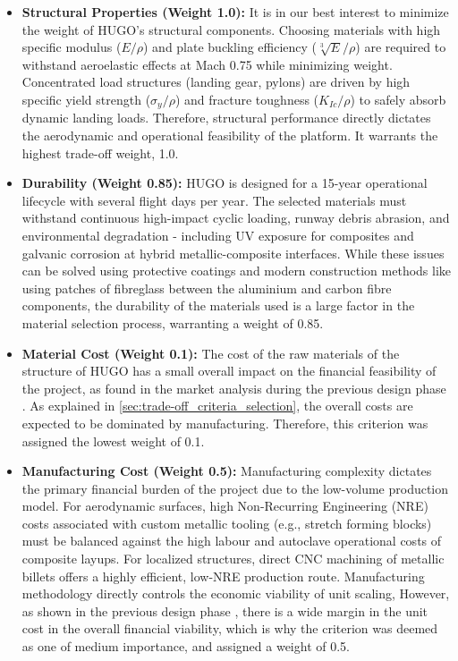 \begin{itemize}
    \item \textbf{Structural Properties (Weight 1.0):} It is in our best interest to minimize the weight of HUGO's structural components. Choosing materials with high specific modulus ($E/\rho$) and plate buckling efficiency ($\sqrt[3]{E}/\rho$) are required to withstand aeroelastic effects at Mach 0.75 while minimizing weight. Concentrated load structures (landing gear, pylons) are driven by high specific yield strength ($\sigma_y/\rho$) and fracture toughness ($K_{Ic}/\rho$) to safely absorb dynamic landing loads. Therefore, structural performance directly dictates the aerodynamic and operational feasibility of the platform. It warrants the highest trade-off weight, 1.0.
    
    \item \textbf{Durability (Weight 0.85):} HUGO is designed for a 15-year operational lifecycle with several flight days per year. The selected materials must withstand continuous high-impact cyclic loading, runway debris abrasion, and environmental degradation - including UV exposure for composites and galvanic corrosion at hybrid metallic-composite interfaces. While these issues can be solved using protective coatings and modern construction methods like using patches of fibreglass between the aluminium and carbon fibre components, the durability of the materials used is a large factor in the material selection process, warranting a weight of 0.85. 

    \item \textbf{Material Cost (Weight 0.1):} The cost of the raw materials of the structure of HUGO has a small overall impact on the financial feasibility of the project, as found in the market analysis during the previous design phase . As explained in \autoref{sec:trade-off_criteria_selection}, the overall costs are expected to be dominated by manufacturing. Therefore, this criterion was assigned the lowest weight of 0.1.

    \item \textbf{Manufacturing Cost (Weight 0.5):} Manufacturing complexity dictates the primary financial burden of the project due to the low-volume production model. For aerodynamic surfaces, high Non-Recurring Engineering (NRE) costs associated with custom metallic tooling (e.g., stretch forming blocks) must be balanced against the high labour and autoclave operational costs of composite layups. For localized structures, direct CNC machining of metallic billets offers a highly efficient, low-NRE production route. Manufacturing methodology directly controls the economic viability of unit scaling, However, as shown in the previous design phase , there is a wide margin in the unit cost in the overall financial viability, which is why the criterion was deemed as one of medium importance, and assigned a weight of 0.5.


\end{itemize}
